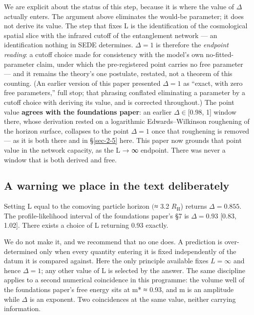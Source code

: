 \documentclass[12pt]{iopart}
\begin{document}
We are explicit about the status of this step, because it is where the
value of \(\Delta\) actually enters. The argument above eliminates the
would-be parameter; it does not derive its value. The step that fixes L
is the identification of the cosmological spatial slice with the
infrared cutoff of the entanglement network --- an identification
nothing in SEDE determines. \(\Delta  = 1\) is therefore the
\emph{endpoint reading}: a cutoff choice made for consistency with the
model's own no-fitted-parameter claim, under which the pre-registered
point carries no free parameter --- and it remains the theory's one
postulate, restated, not a theorem of this counting. (An earlier version
of this paper presented \(\Delta  = 1\) as ``exact, with zero free
parameters,'' full stop; that phrasing conflated eliminating a parameter
by a cutoff choice with deriving its value, and is corrected
throughout.) The point value \textbf{agrees with the foundations paper}:
an earlier \(\Delta  \in  [0.98\), 1{]} window there, whose derivation
rested on a logarithmic Edwards--Wilkinson roughening of the horizon
surface, collapses to the point \(\Delta  = 1\) once that roughening is
removed --- as it is both there and in §\ref{sec-2-5} here. This paper
now grounds that point value in the network capacity, as the L → ∞
endpoint. There was never a window that is both derived and free.

\subsection{A warning we place in the text deliberately}\label{sec-5-4}

Setting L equal to the comoving particle horizon \((\)≈ 3.2
\(R_{\mathrm{H}}\)) returns \(\Delta  = 0.855\). The profile-likelihood
interval of the foundations paper's §7 is \(\Delta  = 0.93\) {[}0.83,
1.02{]}. There exists a choice of L returning 0.93 exactly.

We do not make it, and we recommend that no one does. A prediction is
over-determined only when every quantity entering it is fixed
independently of the datum it is compared against. Here the only
principle available fixes \(L = \infty\) and hence \(\Delta  = 1\); any
other value of L is selected by the answer. The same discipline applies
to a second numerical coincidence in this programme: the volume well of
the foundations paper's free energy sits at m* ≈ 0.93, and m is an
amplitude while \(\Delta\) is an exponent. Two coincidences at the same
value, neither carrying information.
\end{document}
